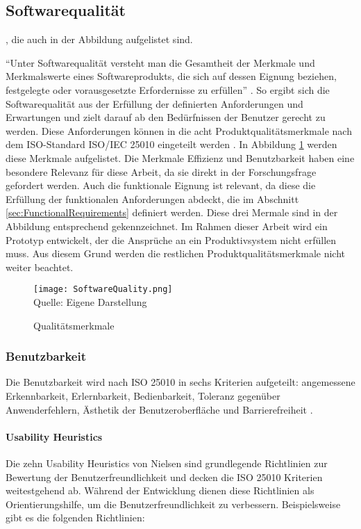 \subsection{Softwarequalität}
, die auch in der Abbildung  aufgelistet sind.

``Unter Softwarequalität versteht man die Gesamtheit der Merkmale und Merkmalswerte eines Softwareprodukts, die sich auf dessen Eignung beziehen, festgelegte oder vorausgesetzte Erfordernisse zu erfüllen'' \cite[S.~257]{Balzert1998}. So ergibt sich die Softwarequalität aus der Erfüllung der definierten Anforderungen und Erwartungen und zielt darauf ab den Bedürfnissen der Benutzer gerecht zu werden. Diese Anforderungen können in die acht Produktqualitätsmerkmale nach dem ISO-Standard ISO/IEC 25010 eingeteilt werden \cite{ISO25010}. In Abbildung \ref{fig:SoftwareQuality} werden diese Merkmale aufgelistet. Die Merkmale Effizienz und Benutzbarkeit haben eine besondere Relevanz für diese Arbeit, da sie direkt in der Forschungsfrage gefordert werden. Auch die funktionale Eignung ist relevant, da diese die Erfüllung der funktionalen Anforderungen abdeckt, die im Abschnitt \ref{sec:FunctionalRequirements} definiert werden. Diese drei Mermale sind in der Abbildung entsprechend gekennzeichnet. Im Rahmen dieser Arbeit wird ein Prototyp entwickelt, der die Ansprüche an ein Produktivsystem nicht erfüllen muss. Aus diesem Grund werden die restlichen Produktqualitätsmerkmale nicht weiter beachtet.

\begin{figure}[H]
    \caption{Qualitätsmerkmale}\label{fig:SoftwareQuality}
    \texttt{[image: SoftwareQuality.png]}
    \\
    Quelle: Eigene Darstellung
\end{figure}

\subsubsection{Benutzbarkeit}
Die Benutzbarkeit wird nach ISO 25010 in sechs Kriterien aufgeteilt: angemessene Erkennbarkeit, Erlernbarkeit, Bedienbarkeit, Toleranz gegenüber Anwenderfehlern, Ästhetik der Benutzeroberfläche und Barrierefreiheit \cite{ISO25010}.

\paragraph{Usability Heuristics}
Die zehn Usability Heuristics von Nielsen sind grundlegende Richtlinien zur Bewertung der Benutzerfreundlichkeit \cite{Nielsen.1994} und decken die ISO 25010 Kriterien weitestgehend ab. Während der Entwicklung dienen diese Richtlinien als Orientierungshilfe, um die Benutzerfreundlichkeit zu verbessern. Beispielsweise gibt es die folgenden Richtlinien:

